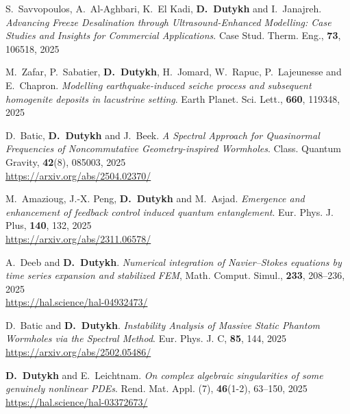 \documentclass[final, a4paper, oneside, 12pt]{article}
\numberwithin{equation}{section}
\begin{document}
\begin{etaremune}
  \item S.~Savvopoulos, A.~Al-Aghbari, K.~El Kadi, \textbf{D.~Dutykh} and I.~Janajreh. \textit{Advancing Freeze Desalination through Ultrasound-Enhanced Modelling: Case Studies and Insights for Commercial Applications}. Case Stud. Therm. Eng., \textbf{73}, 106518, 2025 %

  \item M.~Zafar, P.~Sabatier, \textbf{D.~Dutykh}, H.~Jomard, W.~Rapuc, P.~Lajeunesse and E.~Chapron. \textit{Modelling earthquake-induced seiche process and subsequent homogenite deposits in lacustrine setting}. Earth Planet. Sci. Lett., \textbf{660}, 119348, 2025 %

  \item D.~Batic, \textbf{D.~Dutykh} and J.~Beek. \textit{A Spectral Approach for Quasinormal Frequencies of Noncommutative Geometry-inspired Wormholes}. Class. Quantum Gravity, \textbf{42}(8), 085003, 2025 \\ %
  \url{https://arxiv.org/abs/2504.02370/}

  \item M.~Amazioug, J.-X. Peng, \textbf{D.~Dutykh} and M.~Asjad. \textit{Emergence and enhancement of feedback control induced quantum entanglement}. Eur. Phys. J. Plus, \textbf{140}, 132, 2025 \\ %
  \url{https://arxiv.org/abs/2311.06578/}

  \item A.~Deeb and \textbf{D.~Dutykh}. \textit{Numerical integration of Navier--Stokes equations by time series expansion and stabilized FEM}, Math. Comput. Simul., \textbf{233}, 208--236, 2025 \\ %
  \url{https://hal.science/hal-04932473/}

  \item D.~Batic and \textbf{D.~Dutykh}. \textit{Instability Analysis of Massive Static Phantom Wormholes via the Spectral Method}. Eur. Phys. J. C, \textbf{85}, 144, 2025 \\ %
  \url{https://arxiv.org/abs/2502.05486/}

  \item \textbf{D.~Dutykh} and E.~Leichtnam. \textit{On complex algebraic singularities of some genuinely nonlinear PDEs}. Rend. Mat. Appl. (7), \textbf{46}(1-2), 63--150, 2025 \\ %
  \url{https://hal.science/hal-03372673/}


\end{etaremune}
\end{document}
